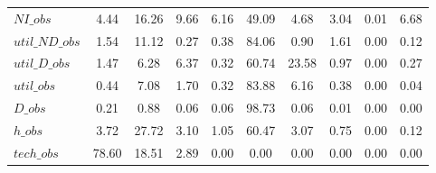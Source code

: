 \begin{center}
\begin{longtable}{lccccccccc}
$NI\_obs        $	 & 	         4.44	 & 	        16.26	 & 	         9.66	 & 	         6.16	 & 	        49.09	 & 	         4.68	 & 	         3.04	 & 	         0.01	 & 	         6.68 \\ 
$util\_ND\_obs  $	 & 	         1.54	 & 	        11.12	 & 	         0.27	 & 	         0.38	 & 	        84.06	 & 	         0.90	 & 	         1.61	 & 	         0.00	 & 	         0.12 \\ 
$util\_D\_obs   $	 & 	         1.47	 & 	         6.28	 & 	         6.37	 & 	         0.32	 & 	        60.74	 & 	        23.58	 & 	         0.97	 & 	         0.00	 & 	         0.27 \\ 
$util\_obs      $	 & 	         0.44	 & 	         7.08	 & 	         1.70	 & 	         0.32	 & 	        83.88	 & 	         6.16	 & 	         0.38	 & 	         0.00	 & 	         0.04 \\ 
$D\_obs         $	 & 	         0.21	 & 	         0.88	 & 	         0.06	 & 	         0.06	 & 	        98.73	 & 	         0.06	 & 	         0.01	 & 	         0.00	 & 	         0.00 \\ 
$h\_obs         $	 & 	         3.72	 & 	        27.72	 & 	         3.10	 & 	         1.05	 & 	        60.47	 & 	         3.07	 & 	         0.75	 & 	         0.00	 & 	         0.12 \\ 
$tech\_obs      $	 & 	        78.60	 & 	        18.51	 & 	         2.89	 & 	         0.00	 & 	         0.00	 & 	         0.00	 & 	         0.00	 & 	         0.00	 & 	         0.00 \\ 
\end{longtable}
 \end{center}
